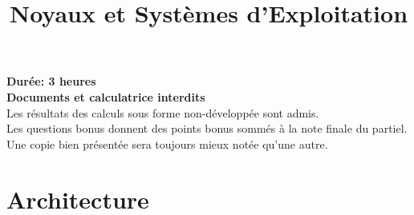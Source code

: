 %
%
%
%
%
%
%

%
%

\def\path{../../..}

%
%



%
%
\usepackage[utf8]{inputenc}
\usepackage{enumitem}
\usepackage{geometry}



%
%

\title{Noyaux et Systèmes d'Exploitation}

%
%

\rhead{}

%
%

\maketitle

%
%

\indentation{}

%
%

\begin{center}

\textbf{Durée: 3 heures}\\
\textbf{Documents et calculatrice interdits}\\
\scriptsize{Les résultats des calculs sous forme non-développée sont admis.}\\
\scriptsize{Les questions bonus donnent des points bonus sommés à la note finale du partiel.}\\
\scriptsize{Une copie bien présentée sera toujours mieux notée qu'une autre.}

\end{center}

%
%

%
%

\section{{Architecture}
         {\hfill{} }}


